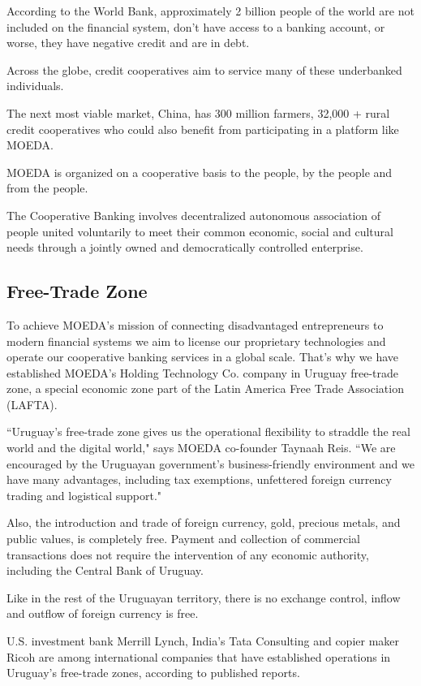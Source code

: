 \documentclass{article}
\begin{document}
According to the World Bank, approximately 2 billion people of the world are not included on the financial system, don’t have access to a banking account, or worse, they have negative credit and are in debt. 

Across the globe, credit cooperatives aim to service many of these underbanked individuals. 

The next most viable market, China, has 300 million farmers, 32,000 + rural credit cooperatives who could also benefit from participating in a platform like MOEDA.

MOEDA is organized on a cooperative basis to the people, by the people and from the people.

The Cooperative Banking involves decentralized autonomous association of people united voluntarily to meet their common economic, social and cultural needs through a jointly owned and democratically controlled enterprise.


\subsection{Free-Trade Zone}

To achieve MOEDA’s mission of connecting disadvantaged entrepreneurs to modern financial systems we aim to license our proprietary technologies and operate our cooperative banking services in a global scale. That’s why we have established MOEDA’s Holding Technology Co. company in Uruguay free-trade zone, a special economic zone part of the Latin America Free Trade Association (LAFTA).

``Uruguay's free-trade zone gives us the operational flexibility to straddle the real world and the digital world," says MOEDA co-founder Taynaah Reis. ``We are encouraged by the Uruguayan government’s business-friendly environment and we have many advantages, including tax exemptions, unfettered foreign currency trading and logistical support."

Also, the introduction and trade of foreign currency, gold, precious metals, and public values, is completely free. Payment and collection of commercial transactions does not require the intervention of any economic authority, including the Central Bank of Uruguay.

Like in the rest of the Uruguayan territory, there is no exchange control, inflow and outflow of foreign currency is free. 

U.S. investment bank Merrill Lynch, India’s Tata Consulting and copier maker Ricoh are among international companies that have established operations in Uruguay’s free-trade zones, according to published reports.
\end{document}
